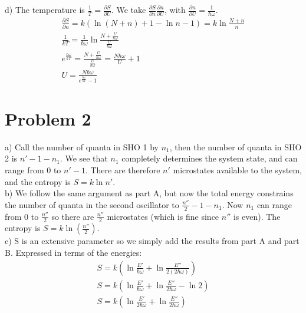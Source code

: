 \documentclass[a4paper,11pt]{article}
\numberwithin{equation}{section}
\begin{document}
d) The temperature is $\frac{1}{T}=\frac{\partial S}{\partial U}$. 
We take $\frac{\partial S}{\partial n}\frac{\partial n}{\partial U}$, with $\frac{\partial n}{\partial U}=\frac{1}{\hbar \omega}$.
\begin{gather}
 \frac{\partial S}{\partial n}=k\left(\ln{(N+n)}+1-\ln{n}-1 \right)=k\ln{\frac{N+n}{n}}\\
 \frac{1}{kT}=\frac{1}{\hbar \omega}\ln{\frac{N+\frac{U}{\hbar \omega}}{\frac{U}{\hbar \omega}}}\\
 e^{\frac{\hbar \omega}{kT}}=\frac{N+\frac{U}{\hbar \omega}}{\frac{U}{\hbar \omega}}=\frac{N\hbar \omega}{U}+1\\
 U=\frac{N\hbar \omega}{e^{\frac{\hbar \omega}{kT}}-1}
\end{gather}

\section{Problem 2}
a) Call the number of quanta in SHO 1 by $n_1$, then the number of quanta in SHO 2 is $n'-1-n_1$.
We see that $n_1$ completely determines the system state, and can range from 0 to $n'-1$. 
There are therefore $n'$ microstates available to the system, and the entropy is $S=k\ln{n'}$.\\
b) We follow the same argument as part A, but now the total energy constrains the number of quanta in 
the second oscillator to $\frac{n''}{2}-1-n_1$. 
Now $n_1$ can range from 0 to $\frac{n''}{2}$ so there are $\frac{n''}{2}$ microstates (which is fine since $n''$ is even).
The entropy is $S=k\ln{(\frac{n''}{2})}$.\\
c) S is an extensive parameter so we simply add the results from part A and part B. Expressed in terms of the energies:
\begin{gather}
 S=k\left(\ln{\frac{E'}{\hbar \omega}}+\ln{\frac{E''}{2(2\hbar \omega)}}   \right)\\
 S=k\left(\ln{\frac{E'}{\hbar \omega}}+\ln{\frac{E''}{2\hbar \omega}}-\ln{2}   \right)\\
 S=k\left(\ln{\frac{E'}{2\hbar \omega}}+\ln{\frac{E''}{2\hbar \omega}}   \right)
\end{gather}
\end{document}
